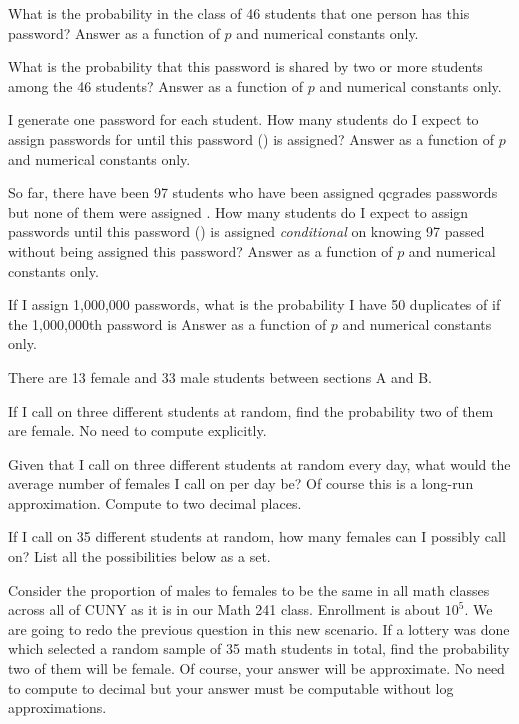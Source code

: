 \documentclass[12pt]{article}
\begin{document}
\benum

 What is the probability in the class of 46 students that one person has this password? Answer as a function of $p$ and numerical constants only. 

 What is the probability that this password is shared by two or more students among the 46 students? Answer as a function of $p$ and numerical constants only. 


 I generate one password for each student. How many students do I expect to assign passwords for until this password () is assigned? Answer as a function of $p$ and numerical constants only. 

 So far, there have been 97 students who have been assigned qcgrades passwords but none of them were assigned . How many students do I expect to assign passwords until this password () is assigned \textit{conditional} on knowing 97 passed without being assigned this password? Answer as a function of $p$ and numerical constants only.  

 If I assign 1,000,000 passwords, what is the probability I have 50 duplicates of  if the 1,000,000th password is  Answer as a function of $p$ and numerical constants only. 

\eenum




\problem There are 13 female and 33 male students between sections A and B.

\benum

 If I call on three different students at random, find the probability two of them are female. No need to compute explicitly. 

 Given that I call on three different students at random every day, what would the average number of females I call on per day be? Of course this is a long-run approximation. Compute to two decimal places. 

 If I call on 35 different students at random, how many females can I possibly call on? List all the possibilities below as a set. 

 Consider the proportion of males to females to be the same in all math classes across all of CUNY as it is in our Math 241 class. Enrollment is about $10^5$. We are going to redo the previous question in this new scenario. If a lottery was done which selected a random sample of 35 math students in total, find the probability two of them will be female. Of course, your answer will be approximate. No need to compute to decimal but your answer must be computable without log approximations. 
\end{document}
